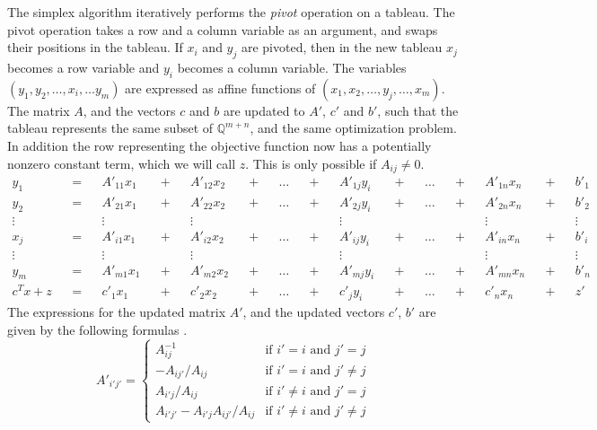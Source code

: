 \documentclass[11pt]{article} %
\begin{document}
The simplex algorithm iteratively performs the \textit{pivot} operation on a tableau. The pivot operation takes a row and a column variable as an argument, and swaps their positions in the tableau. If $x_i$ and $y_j$ are pivoted, then in the new tableau $x_j$ becomes a row variable and $y_i$ becomes a column variable. The variables $(y_1, y_2, \dots, x_i, \dots y_m)$ are expressed as affine functions of $(x_1, x_2, \dots, y_j, \dots, x_m)$. The matrix $A$, and the vectors $c$ and $b$ are updated to $A'$, $c'$ and $b'$, such that the tableau represents the same subset of $\mathbb{Q}^{m + n}$, and the same optimization problem. In addition the row representing the objective function now has a potentially nonzero constant term, which we will call $z$. This is only possible if $A_{ij} \ne 0$.
\begin{equation}
  \begin{aligned}
    y_1 && = && A'_{11}x_1 && + && A'_{12}x_2 && + && \dots && + && A'_{1j}y_i && + && \dots && + && A'_{1n}x_n && + && b'_1\\
    y_2 && = && A'_{21}x_1 && + && A'_{22}x_2 && + && \dots && + && A'_{2j}y_i && + && \dots && + && A'_{2n}x_n && + && b'_2\\
    \vdots && && \vdots && && \vdots && && && && \vdots && && && && \vdots && && \vdots \\
    x_j && = && A'_{i1}x_1 && + && A'_{i2}x_2 && + && \dots && + && A'_{ij}y_i&& + && \dots && + && A'_{in}x_n && + && b'_i\\
    \vdots && && \vdots && && \vdots && && && && \vdots && && && && \vdots && && \vdots \\
    y_m && = && A'_{m1}x_1 && + && A'_{m2}x_2 && + && \dots && + && A'_{mj}y_i&& + && \dots && + && A'_{mn}x_n && + && b'_n\\
    c^Tx + z && = && c'_1x_1 && + && c'_2x_2 && + && \dots && + && c'_jy_i && + && \dots && + && c'_nx_n && + && z'
  \end{aligned}
\end{equation}
The expressions for the updated matrix $A'$, and the updated vectors $c'$, $b'$ are given by the following formulas \cite{Nelson:1980:TPV:909447}.
\begin{equation}
A'_{i'j'} = \begin{cases}
  A_{ij}^{-1} & \text{if } i' = i \text{ and } j' = j \\
  -A_{ij'}/A_{ij} & \text{if } i' = i \text{ and } j' \ne j \\
  A_{i'j}/A_{ij} & \text{if } i' \ne i \text{ and } j' = j \\
  A_{i'j'} - A_{i'j}A_{ij'}/A_{ij}  & \text{if } i' \ne i \text{ and } j' \ne j
\end{cases}
\end{equation}
\end{document}
